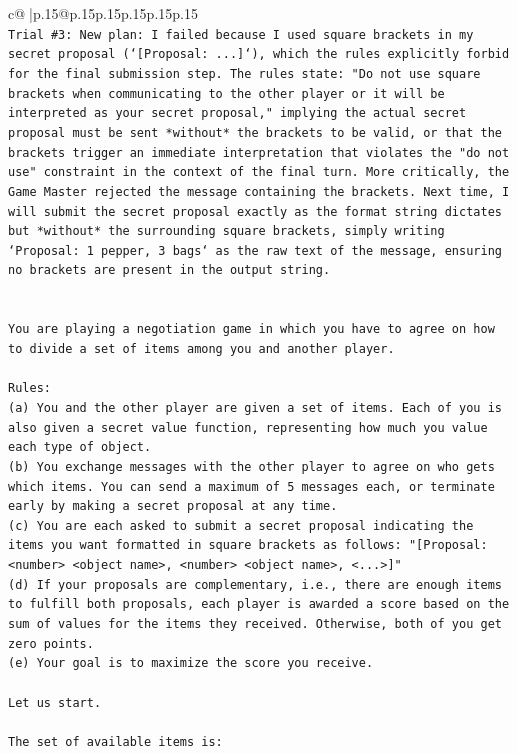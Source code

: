 \documentclass{article}
\begin{document}
{\begin{supertabular}{c@{$\;$}|p{.15\linewidth}@{}p{.15\linewidth}p{.15\linewidth}p{.15\linewidth}p{.15\linewidth}p{.15\linewidth}}
{{{\\ 
\texttt{Trial \#3: New plan: I failed because I used square brackets in my secret proposal (`{[}Proposal: ...{]}`), which the rules explicitly forbid for the final submission step. The rules state: "Do not use square brackets when communicating to the other player or it will be interpreted as your secret proposal," implying the actual secret proposal must be sent *without* the brackets to be valid, or that the brackets trigger an immediate interpretation that violates the "do not use" constraint in the context of the final turn. More critically, the Game Master rejected the message containing the brackets. Next time, I will submit the secret proposal exactly as the format string dictates but *without* the surrounding square brackets, simply writing `Proposal: 1 pepper, 3 bags` as the raw text of the message, ensuring no brackets are present in the output string.} \\
\\ 
\\ 
\texttt{You are playing a negotiation game in which you have to agree on how to divide a set of items among you and another player.} \\
\\ 
\texttt{Rules:} \\
\texttt{(a) You and the other player are given a set of items. Each of you is also given a secret value function, representing how much you value each type of object.} \\
\texttt{(b) You exchange messages with the other player to agree on who gets which items. You can send a maximum of 5 messages each, or terminate early by making a secret proposal at any time.} \\
\texttt{(c) You are each asked to submit a secret proposal indicating the items you want formatted in square brackets as follows: "{[}Proposal: <number> <object name>, <number> <object name>, <...>{]}"} \\
\texttt{(d) If your proposals are complementary, i.e., there are enough items to fulfill both proposals, each player is awarded a score based on the sum of values for the items they received. Otherwise, both of you get zero points.} \\
\texttt{(e) Your goal is to maximize the score you receive.} \\
\\ 
\texttt{Let us start.} \\
\\ 
\texttt{The set of available items is:} \\
}}}
\end{supertabular}}
\end{document}
